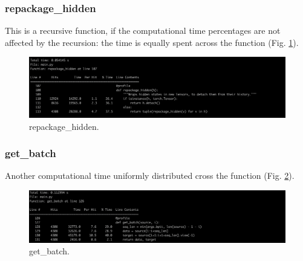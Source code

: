 \documentclass[11pt]{article}
\newcommand{\0}{\mat{0}}
\begin{document}
\begin{itemize}
   \subsubsection*{repackage\_hidden}
   This is a recursive function, if the computational time percentages are not affected by the recursion: the time is equally spent across the function  (Fig. \ref{fig:repackagehidden}).
    \begin{figure}[ht!]
         \centering
 	 \includegraphics[width=\linewidth]{repackageHidden.png}
 	 \caption{repackage\_hidden.}
 	 \label{fig:repackagehidden}
   \end{figure}
   
   \subsubsection*{get\_batch}
   Another computational time uniformly distributed cross the function (Fig. \ref{fig:getbatch}).
   \begin{figure}[ht!]
  	\centering
 	 \includegraphics[width=\linewidth]{getBatch.png}
 	 \caption{get\_batch.}
 	 \label{fig:getbatch}
   \end{figure}


\end{itemize}
\end{document}
